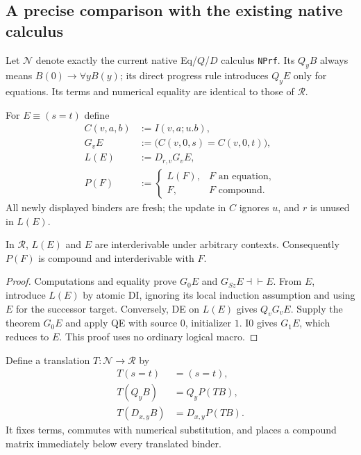 \subsection{A precise comparison with the existing native calculus}
\label{subsec:new-native-comparison}

Let $\mathcal N$ denote exactly the current native Eq/$Q$/$D$ calculus
\texttt{NPrf}.  Its $Q_yB$ always means $B(0)\to\forall yB(y)$; its direct
progress rule introduces $Q_yE$ only for equations.  Its terms and numerical
equality are identical to those of $\mathcal R$.

For $E\equiv(s=t)$ define
\begin{equation}
 \begin{aligned}
 C(v,a,b)&:=I(v,a;u.b),\\
 G_vE&:=\bigl(C(v,0,s)=C(v,0,t)\bigr),\\
 L(E)&:=D_{r,v}G_vE,\\
 P(F)&:=\begin{cases}L(F),&F\text{ an equation},\\F,&F\text{ compound}.
              \end{cases}
 \end{aligned}
 \label{eq:new-padding}
\end{equation}
All newly displayed binders are fresh; the update in $C$ ignores $u$, and
$r$ is unused in $L(E)$.

\begin{lemma}[Padding]
\label{lem:new-padding}
In $\mathcal R$, $L(E)$ and $E$ are interderivable under arbitrary contexts.
Consequently $P(F)$ is compound and interderivable with $F$.
\end{lemma}
\begin{proof}
Computations and equality prove $G_0E$ and
$G_{Sz}E\dashv\vdash E$.  From $E$, introduce $L(E)$ by atomic DI, ignoring
its local induction assumption and using $E$ for the successor target.
Conversely, DE on $L(E)$ gives $Q_vG_vE$.  Supply the theorem $G_0E$ and
apply QE with source $0$, initializer $1$.  I0 gives $G_1E$, which reduces
to $E$.  This proof uses no ordinary logical macro.
\end{proof}

Define a translation $T:\mathcal N\to\mathcal R$ by
\begin{equation}
 \begin{aligned}
 T(s=t)&=(s=t),\\
 T(Q_yB)&=Q_yP(TB),\\
 T(D_{x,y}B)&=D_{x,y}P(TB).
 \end{aligned}
 \label{eq:new-T}
\end{equation}
It fixes terms, commutes with numerical substitution, and places a compound
matrix immediately below every translated binder.

